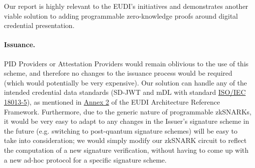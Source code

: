 

Our report is highly relevant to the EUDI's initiatives and demonstrates another viable solution to adding programmable zero-knowledge proofs around digital credential presentation. 

\paragraph{Issuance.} PID Providers or Attestation Providers would remain oblivious to the use of this scheme, and therefore no changes to the issuance process would be required (which would potentially be very expensive).
Our solution can handle any of the intended credential data standards (SD-JWT and mDL with standard \href{https://mobiledl-e5018.web.app/ISO_18013-5_E_draft.pdf}{ISO/IEC 18013-5}), 
as mentioned in \href{https://eu-digital-identity-wallet.github.io/eudi-doc-architecture-and-reference-framework/1.4.0/annexes/annex-2/annex-2-high-level-requirements/}{Annex 2} of the EUDI Architecture Reference Framework.
Furthermore, due to the generic nature of programmable zkSNARKs, it would be very easy to adapt to any changes in the Issuer's signature scheme in the future (e.g. switching to post-quantum signature schemes) will be easy to take into consideration;
we would simply modify our zkSNARK circuit to reflect the computation of a new signature verification, without having to come up with a new ad-hoc protocol for a specific signature scheme.  

